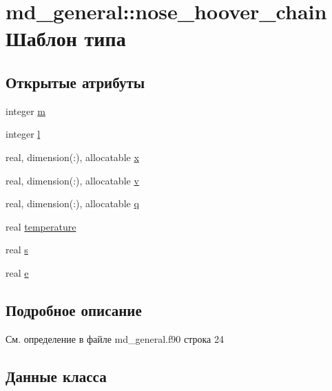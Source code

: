 \hypertarget{structmd__general_1_1nose__hoover__chain}{}\section{md\+\_\+general\+:\+:nose\+\_\+hoover\+\_\+chain Шаблон типа}
\label{structmd__general_1_1nose__hoover__chain}
\subsection*{Открытые атрибуты}
\begin{DoxyCompactItemize}
\item 
integer \mbox{\hyperlink{structmd__general_1_1nose__hoover__chain_a6b99a05b68dea4d1179523f8f0310917}{m}}
\item 
integer \mbox{\hyperlink{structmd__general_1_1nose__hoover__chain_a9cb81aeee044252814a9b959e0cd5055}{l}}
\item 
real, dimension(\+:), allocatable \mbox{\hyperlink{structmd__general_1_1nose__hoover__chain_a5f4feaef1d5ac49538cefcd0596ca338}{x}}
\item 
real, dimension(\+:), allocatable \mbox{\hyperlink{structmd__general_1_1nose__hoover__chain_a38a75d3497e08ad7b59300f766dc1e71}{v}}
\item 
real, dimension(\+:), allocatable \mbox{\hyperlink{structmd__general_1_1nose__hoover__chain_ae01991b9910269b4c589d0ee86405a6d}{q}}
\item 
real \mbox{\hyperlink{structmd__general_1_1nose__hoover__chain_a0c462345b3a1e186c80ae70c93f7e00b}{temperature}}
\item 
real \mbox{\hyperlink{structmd__general_1_1nose__hoover__chain_af4dd5e3a7bb351f4e34cb7884c23f272}{s}}
\item 
real \mbox{\hyperlink{structmd__general_1_1nose__hoover__chain_adf1a35e4d0e9df95def297debd671c02}{e}}
\end{DoxyCompactItemize}


\subsection{Подробное описание}


См. определение в файле md\+\_\+general.\+f90 строка 24



\subsection{Данные класса}
\mbox{\label{structmd__general_1_1nose__hoover__chain_adf1a35e4d0e9df95def297debd671c02}} 
